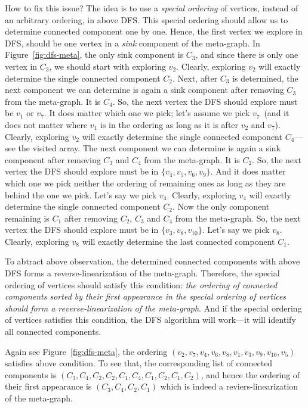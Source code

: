 How to fix this issue? The idea is to use a \emph{special ordering} of vertices, instead of an arbitrary ordering, in above DFS.
This special ordering should allow us to determine connected component one by one. Hence, the first vertex we explore in DFS,
should be one vertex in a \emph{sink} component of the meta-graph. In Figure~\ref{fig:dfs-meta}, the only sink component is $C_3$,
and since there is only one vertex in $C_3$, we should start with exploring $v_2$.
Clearly, exploring $v_2$ will exactly determine the single connected component $C_2$.
Next, after $C_3$ is determined, the next component we can determine is again a sink component after removing $C_3$ from the meta-graph.
It is $C_4$. So, the next vertex the DFS should explore must be $v_1$ or $v_7$. It does matter which one we pick; let's assume we pick $v_7$~(and it
does not matter where $v_1$ is in the ordering as long as it is after $v_2$ and $v_7$).
Clearly, exploring $v_2$ will exactly determine the single connected component $C_4$---see the visited array.
The next component we can determine is again a sink component after removing $C_3$ and $C_4$ from the meta-graph.
It is $C_2$. So, the next vertex the DFS should explore must be in $\{v_4, v_5,v_6,v_9\}$. 
And it does matter which one we pick neither the ordering of remaining ones as long as they are behind the one we pick.
Let's say we pick $v_4$. Clearly, exploring $v_4$ will exactly determine the single connected component $C_2$.
Now the only component remaining is $C_1$ after removing $C_2$, $C_3$ and $C_4$ from the meta-graph.
So, the next vertex the DFS should explore must be in $\{v_3, v_8, v_{10}\}$. 
Let's say we pick $v_8$. Clearly, exploring $v_8$ will exactly determine the last connected component $C_1$.


To abtract above observation, the determined connected components with above DFS
forms a reverse-linearization of the meta-graph.
Therefore, the special ordering of vertices should satisfy this condition:
\emph{the ordering of connected components sorted by their first appearance in the special ordering of vertices
should form a reverse-linearization of the meta-graph}.
And if the special ordering of vertices satisfies this condition, the DFS algorithm will work---it will identify
all connected components.

Again see Figure~\ref{fig:dfs-meta}, the ordering 
$( v_{2} ,v_{7} ,v_{4} ,v_{6} ,v_{8} ,v_{1} ,v_{3} ,v_{9} ,v_{10} ,v_{5})$ satisfies above condition.
To see that, the corresponding list of connected components is 
$(C_3, C_4, C_2, C_2, C_1, C_4, C_1, C_2, C_1, C_2)$,
and hence the ordering of their first appearance is $(C_3, C_4, C_2, C_1)$ which is indeed a reviers-linearization of the meta-graph.

